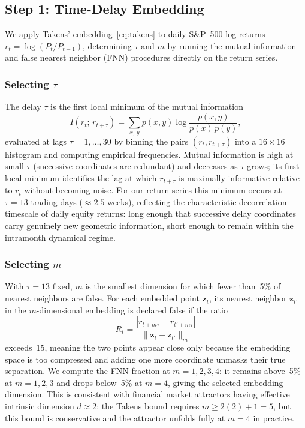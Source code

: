 \documentclass[conference,10pt]{IEEEtran}
\begin{document}
\subsection{Step 1: Time-Delay Embedding}\label{sec:step1}

We apply Takens' embedding~\eqref{eq:takens} to daily S\&P~500 log
returns $r_t = \log(P_t / P_{t-1})$, determining $\tau$ and $m$ by
running the mutual information and false nearest neighbor (FNN)
procedures directly on the return series.

\subsubsection{Selecting \texorpdfstring{$\tau$}{tau}}
The delay $\tau$ is the first local minimum of the mutual information
\begin{equation}
    I(r_t;\, r_{t+\tau})
    = \sum_{x,\,y} p(x,y)\log\frac{p(x,y)}{p(x)\,p(y)},
    \label{eq:mi}
\end{equation}
evaluated at lags $\tau = 1, \ldots, 30$ by binning the pairs
$(r_t, r_{t+\tau})$ into a $16{\times}16$ histogram and computing
empirical frequencies. Mutual information is high at small $\tau$
(successive coordinates are redundant) and decreases as $\tau$ grows;
its first local minimum identifies the lag at which $r_{t+\tau}$ is
maximally informative relative to $r_t$ without becoming noise. For
our return series this minimum occurs at $\tau = 13$ trading days
(${\approx}2.5$ weeks), reflecting the characteristic decorrelation
timescale of daily equity returns: long enough that successive delay
coordinates carry genuinely new geometric information, short enough to
remain within the intramonth dynamical regime.

\subsubsection{Selecting \texorpdfstring{$m$}{m}}
With $\tau = 13$ fixed, $m$ is the smallest dimension for which fewer
than~5\% of nearest neighbors are false. For each embedded point
$\mathbf{z}_t$, its nearest neighbor $\mathbf{z}_{t'}$ in the
$m$-dimensional embedding is declared false if the ratio
\begin{equation}
    R_t = \frac{|r_{t+m\tau} - r_{t'+m\tau}|}
               {\|\mathbf{z}_t - \mathbf{z}_{t'}\|_m}
    \label{eq:fnn}
\end{equation}
exceeds~15, meaning the two points appear close only because the
embedding space is too compressed and adding one more coordinate
unmasks their true separation. We compute the FNN fraction at
$m = 1, 2, 3, 4$: it remains above~5\% at $m = 1, 2, 3$ and drops
below~5\% at $m = 4$, giving the selected embedding dimension. This
is consistent with financial market attractors having effective
intrinsic dimension $d \approx 2$: the Takens bound requires
$m \geq 2(2)+1 = 5$, but this bound is conservative and the attractor
unfolds fully at $m = 4$ in practice.
\end{document}

